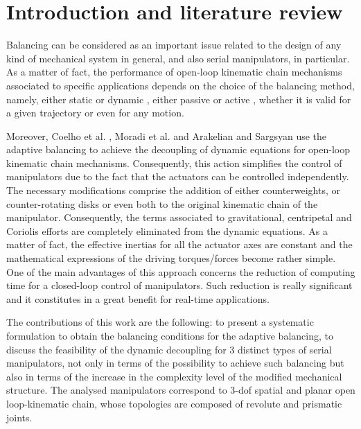 \documentclass[a4paper,11pt,brazil,fleqn]{article}
\begin{document}
\section{Introduction and literature review}\label{S01}

Balancing can be considered as an important issue related to the design of any kind of mechanical system in general, and also serial manipulators, in particular. As a matter of fact, the performance of open-loop kinematic chain mechanisms associated to specific applications depends on the choice of the balancing method, namely, either static \cite{6wang} or dynamic \cite{4wu}, either passive \cite{1wijk,4wu,5gosselin,6wang,7wang,8alici,9alici,10dehkordi,12russo,13agrawal} or active \cite{2arakelian,3seo,11wang,14briot,15coelho,16moradi}, whether it is valid for a given trajectory or even for any motion.

Moreover, Coelho et al. \cite{15coelho}, Moradi et al. \cite{16moradi} and Arakelian and Sargsyan \cite{17arakelian} use the adaptive balancing to achieve the decoupling of dynamic equations for open-loop kinematic chain mechanisms. Consequently, this action simplifies the control of manipulators due to the fact that the actuators can be controlled independently. The necessary modifications comprise the addition of either counterweights, or counter-rotating disks or even both to the original kinematic chain of the manipulator. Consequently, the terms associated to gravitational, centripetal and Coriolis efforts are completely eliminated from the dynamic equations. As a matter of fact, the effective inertias for all the actuator axes are constant and the mathematical expressions of the driving torques/forces become rather simple. One of the main advantages of this approach concerns the reduction of computing time for a closed-loop control of manipulators. Such reduction is really significant and it constitutes in a great benefit for real-time applications.

The contributions of this work are the following: to present a systematic formulation to obtain the balancing conditions for the adaptive balancing, to discuss the feasibility of the dynamic decoupling for 3 distinct types of serial manipulators, not only in terms of the possibility to achieve such balancing but also in terms of the increase in the complexity level of the modified mechanical structure. The analysed manipulators correspond to 3-dof spatial and planar open loop-kinematic chain, whose topologies are composed of revolute and prismatic joints. 
\end{document}
